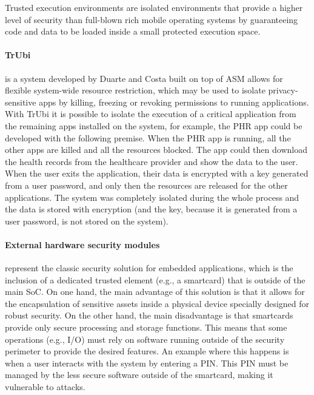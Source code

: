 Trusted execution environments are isolated environments that provide a higher level of security than full-blown rich mobile operating systems by guaranteeing code and data to be loaded inside a small protected execution space.

\paragraph{\textbf{TrUbi}} is a system developed by Duarte \cite{nunoduarte} and Costa \cite{miguelcosta} built on top of ASM \cite{heuser2014asm} allows for flexible system-wide resource restriction, which may be used to isolate privacy-sensitive apps by killing, freezing or revoking permissions to running applications. With TrUbi it is possible to isolate the execution of a critical application from the remaining apps installed on the system, for example, the \ac{PHR} app could be developed with the following premise. When the \ac{PHR} app is running, all the other apps are killed and all the resources blocked. The app could then download the health records from the healthcare provider and show the data to the user. When the user exits the application, their data is encrypted with a key generated from a user password, and only then the resources are released for the other applications. The system was completely isolated during the whole process and the data is stored with encryption (and the key, because it is generated from a user password, is not stored on the system).

\paragraph{\textbf{External hardware security modules}} represent the classic security solution for embedded applications, which is the inclusion of a dedicated trusted element (e.g., a smartcard) that is outside of the main \ac{SoC}. On one hand, the main advantage of this solution is that it allows for the encapsulation of sensitive assets inside a physical device specially designed for robust security. On the other hand, the main disadvantage is that smartcards provide only secure processing and storage functions. This means that some operations (e.g., I/O) must rely on software running outside of the security perimeter to provide the desired features. An example where this happens is when a user interacts with the system by entering a \ac{PIN}. This \ac{PIN} must be managed by the less secure software outside of the smartcard, making it vulnerable to attacks.

